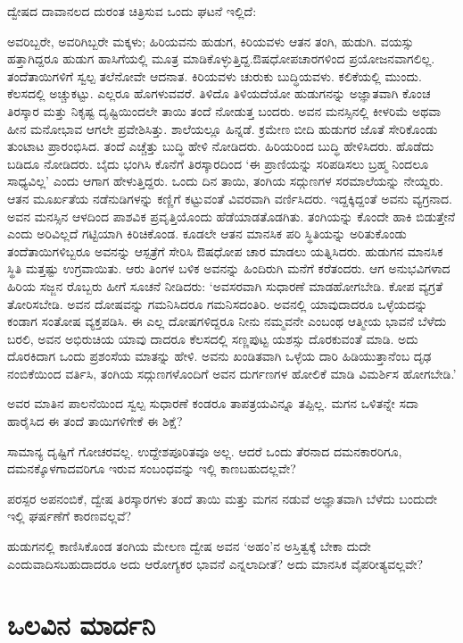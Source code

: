 ದ್ವೇಷದ ದಾವಾನಲದ ದುರಂತ ಚಿತ್ರಿಸುವ ಒಂದು ಘಟನೆ ಇಲ್ಲಿದೆ:

ಅವರಿಬ್ಬರೇ, ಅವರಿಗಿಬ್ಬರೇ ಮಕ್ಕಳು; ಹಿರಿಯವನು ಹುಡುಗ, ಕಿರಿಯವಳು ಆತನ ತಂಗಿ, ಹುಡುಗಿ. ವಯಸ್ಸು ಹತ್ತಾಗಿದ್ದರೂ ಹುಡುಗ ಹಾಸಿಗೆಯಲ್ಲಿ ಮೂತ್ರ ಮಾಡಿಕೊಳ್ಳುತ್ತಿದ್ದ.\break ಔಷಧೋಪಚಾರಗಳಿಂದ ಪ್ರಯೋಜನವಾಗಲಿಲ್ಲ. ತಂದೆತಾಯಿಗಳಿಗೆ ಸ್ವಲ್ಪ ತಲೆನೋವೇ ಆದ\-ನಾತ. ಕಿರಿಯವಳು ಚುರುಕು ಬುದ್ಧಿಯವಳು. ಕಲಿಕೆಯಲ್ಲಿ ಮುಂದು. ಕೆಲಸದಲ್ಲಿ ಅಚ್ಚುಕಟ್ಟು. ಎಲ್ಲರೂ ಹೊಗಳುವವರೆ. ತಿಳಿದೊ ತಿಳಿಯದೆಯೋ ಹುಡುಗನನ್ನು ಅಜ್ಞಾತವಾಗಿ ಕೊಂಚ ತಿರಸ್ಕಾರ ಮತ್ತು ನಿಕೃಷ್ಟ ದೃಷ್ಟಿಯಿಂದಲೇ ತಾಯಿ ತಂದೆ ನೋಡುತ್ತ ಬಂದರು. ಅವನ ಮನಸ್ಸಿನಲ್ಲಿ ಕೀಳರಿಮೆ ಅಥವಾ ಹೀನ ಮನೋಭಾವ ಆಗಲೇ ಪ್ರವೇಶಿಸಿತ್ತು. ಶಾಲೆಯಲ್ಲೂ ಹಿನ್ನಡೆ. ಕ್ರಮೇಣ ಬೀದಿ ಹುಡುಗರ ಜೊತೆ ಸೇರಿಕೊಂಡು ತುಂಟಾಟ ಪ್ರಾರಂಭಿಸಿದ. ತಂದೆ ಎಚ್ಚೆತ್ತು ಬುದ್ಧಿ ಹೇಳಿ ನೋಡಿದರು. ಹಿರಿಯರಿಂದ ಬುದ್ಧಿ ಹೇಳಿಸಿದರು. ಹೊಡೆದು ಬಡಿದೂ ನೋಡಿದರು. ಬೈದು ಭಂಗಿಸಿ ಕೊನೆಗೆ ತಿರಸ್ಕಾರದಿಂದ ‘ಈ ಪ್ರಾಣಿಯನ್ನು ಸರಿಪಡಿಸಲು ಬ್ರಹ್ಮ ನಿಂದಲೂ ಸಾಧ್ಯವಿಲ್ಲ’ ಎಂದು ಆಗಾಗ ಹೇಳುತ್ತಿದ್ದರು. ಒಂದು ದಿನ ತಾಯಿ, ತಂಗಿಯ ಸದ್ಗುಣಗಳ ಸರಮಾಲೆಯನ್ನು ನೇಯ್ದರು. ಆತನ ಮೂರ್ಖತೆಯ ನಡೆನುಡಿಗಳನ್ನು ಕಣ್ಣಿಗೆ ಕಟ್ಟುವಂತೆ ವಿವರವಾಗಿ ವರ್ಣಿಸಿದರು. ಇದ್ದಕ್ಕಿದ್ದಂತೆ ಅವನು ವ್ಯಗ್ರನಾದ. ಅವನ ಮನಸ್ಸಿನ ಆಳದಿಂದ ಪಾಶವಿಕ ಪ್ರವೃತ್ತಿಯೊಂದು ಹೆಡೆಯಾಡತೊಡಗಿತು. ತಂಗಿಯನ್ನು ಕೊಂದೇ ಹಾಕಿ ಬಿಡುತ್ತೇನೆ ಎಂದು ಅರಿವಿಲ್ಲದೆ ಗಟ್ಟಿಯಾಗಿ ಕಿರಿಚಿಕೊಂಡ. ಕೂಡಲೇ ಆತನ ಮಾನಸಿಕ ಪರಿ ಸ್ಥಿತಿಯನ್ನು ಅರಿತುಕೊಂಡು ತಂದೆತಾಯಿಗಳಿಬ್ಬರೂ ಅವನನ್ನು ಆಸ್ಪತ್ರೆಗೆ ಸೇರಿಸಿ ಔಷಧೋಪ ಚಾರ ಮಾಡಲು ಯತ್ನಿಸಿದರು. ಹುಡುಗನ ಮಾನಸಿಕ ಸ್ಥಿತಿ ಮತ್ತಷ್ಟು ಉಗ್ರವಾಯಿತು. ಆರು ತಿಂಗಳ ಬಳಿಕ ಅವನನ್ನು ಹಿಂದಿರುಗಿ ಮನೆಗೆ ಕರೆತಂದರು. ಆಗ ಅನುಭವಿಗಳಾದ ಹಿರಿಯ ಸಜ್ಜನ ರೊಬ್ಬರು ಹೀಗೆ ಸೂಚನೆ ನೀಡಿದರು: ‘ಅವಸರವಾಗಿ ಸುಧಾರಣೆ ಮಾಡಹೋಗಬೇಡಿ. ಕೋಪ ವ್ಯಗ್ರತೆ ತೋರಿಸಬೇಡಿ. ಅವನ ದೋಷವನ್ನು ಗಮನಿಸಿದರೂ ಗಮನಿಸದಂತಿರಿ. ಅವನಲ್ಲಿ ಯಾವುದಾದರೂ ಒಳ್ಳೆಯದನ್ನು ಕಂಡಾಗ ಸಂತೋಷ ವ್ಯಕ್ತಪಡಿಸಿ. ಈ ಎಲ್ಲ ದೋಷಗಳಿದ್ದರೂ ನೀನು ನಮ್ಮವನೇ ಎಂಬಂಥ ಆತ್ಮೀಯ ಭಾವನೆ ಬೆಳೆದು ಬರಲಿ, ಅವನ ಅಭಿರುಚಿಯ ಯಾವು ದಾದರೂ ಕೆಲಸದಲ್ಲಿ ಸಣ್ಣಪುಟ್ಟ ಯಶಸ್ಸು ದೊರಕುವಂತೆ ಮಾಡಿ. ಅದು ದೊರಕಿದಾಗ ಒಂದು ಪ್ರಶಂಸೆಯ ಮಾತನ್ನು ಹೇಳಿ. ಅವನು ಖಂಡಿತವಾಗಿ ಒಳ್ಳೆಯ ದಾರಿ ಹಿಡಿಯುತ್ತಾನೆಂಬ ದೃಢ ನಂಬಿಕೆಯಿಂದ ವರ್ತಿಸಿ, ತಂಗಿಯ ಸದ್ಗುಣಗಳೊಂದಿಗೆ ಅವನ ದುರ್ಗಣಗಳ ಹೋಲಿಕೆ ಮಾಡಿ ವಿಮರ್ಶಿಸ ಹೋಗಬೇಡಿ.’

ಅವರ ಮಾತಿನ ಪಾಲನೆಯಿಂದ ಸ್ವಲ್ಪ ಸುಧಾರಣೆ ಕಂಡರೂ ತಾಪತ್ರಯವಿನ್ನೂ ತಪ್ಪಿಲ್ಲ. ಮಗನ ಒಳಿತನ್ನೇ ಸದಾ ಹಾರೈಸಿದ ಈ ತಂದೆ ತಾಯಿಗಳಿಗೇಕೆ ಈ ಶಿಕ್ಷೆ?

ಸಾಮಾನ್ಯ ದೃಷ್ಟಿಗೆ ಗೋಚರವಲ್ಲ. ಉದ್ದೇಶಪೂರಿತವೂ ಅಲ್ಲ. ಆದರೆ ಒಂದು ತೆರನಾದ ದಮನಕಾರರಿಗೂ, ದಮನಕ್ಕೊಳಗಾದವರಿಗೂ ಇರುವ ಸಂಬಂಧವನ್ನು ಇಲ್ಲಿ ಕಾಣಬಹುದಲ್ಲವೇ?

ಪರಸ್ಪರ ಅಪನಂಬಿಕೆ, ದ್ವೇಷ ತಿರಸ್ಕಾರಗಳು ತಂದೆ ತಾಯಿ ಮತ್ತು ಮಗನ ನಡುವೆ ಅಜ್ಞಾತವಾಗಿ ಬೆಳೆದು ಬಂದುದೇ ಇಲ್ಲಿ ಘರ್ಷಣೆಗೆ ಕಾರಣವಲ್ಲವೆ?

ಹುಡುಗನಲ್ಲಿ ಕಾಣಿಸಿಕೊಂಡ ತಂಗಿಯ ಮೇಲಣ ದ್ವೇಷ ಅವನ ‘ಅಹಂ’ನ ಅಸ್ತಿತ್ವಕ್ಕೆ ಬೇಕಾ ದುದೇ ಎಂದುವಾದಿಸಬಹುದಾದರೂ ಅದು ಆರೋಗ್ಯಕರ ಭಾವನೆ ಎನ್ನಲಾದೀತೆ? ಅದು ಮಾನಸಿಕ ವೈಪರೀತ್ಯವಲ್ಲವೇ?


\section*{ಒಲವಿನ ಮಾರ್ದನಿ}

